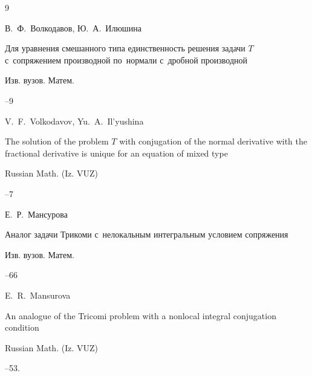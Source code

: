 \begin{thebibliography}{9}

\by В.~Ф.~Волкодавов, Ю.~А.~Илюшина

\paper Для уравнения смешанного типа единственность решения задачи $T$ с~сопряжением производной по~нормали с~дробной производной

\jour Изв. вузов. Матем.



--9




\transl

\by V.~F.~Volkodavov, Yu.~A.~Il'yushina 

\paper The solution of the problem $T$ with conjugation of the normal derivative with the fractional derivative is unique for an equation of mixed type

\jour Russian Math. (Iz. VUZ)




--7




\by Е.~Р.~Мансурова

\paper Аналог задачи Трикоми с~нелокальным интегральным условием сопряжения

\jour Изв. вузов. Матем.



--66



\transl

\by E.~R.~Mansurova

\paper An analogue of the Tricomi problem with a nonlocal integral conjugation condition

\jour Russian Math. (Iz. VUZ)




--53.





\end{thebibliography}
